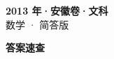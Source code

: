 \documentclass[zihao=-4, a4paper]{ctexart}
\begin{document}
\begin{center}
  {\Large\bfseries 2013 年·安徽卷·文科}\\[4pt]
  {\large 数学 · 简答版}
\end{center}
\medskip
{}

\clearpage
{}
\begin{center}{\Large\bfseries 答案速查}\end{center}
\medskip

\end{document}
